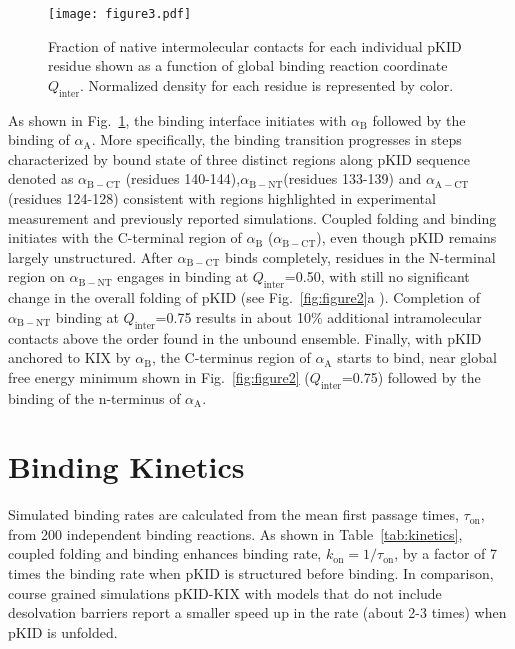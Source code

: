 \documentclass[../talant.diss.submit.tex]{subfiles}
\begin{document}
\begin{figure}[h!]
  \centering
  \texttt{[image: figure3.pdf]}
  \caption{Fraction of native intermolecular contacts for each individual
    pKID residue shown as a function of global binding reaction coordinate $Q_{\mathrm{\mathrm{inter}}}$.
    Normalized density for each residue is represented by color.}
  \label{fig:figure3}
\end{figure}

As shown in Fig.~\ref{fig:figure3}, the binding interface initiates with
$\alpha_{\mathrm{B}}$ followed by the binding of $\alpha_{\mathrm{A}}$.  More
specifically, the binding transition progresses in steps characterized by bound
state of three distinct regions along pKID sequence denoted as
$\alpha_{\mathrm{B-CT}}$ (residues 140-144),$\alpha_{\mathrm{B-NT}}$(residues
133-139) and $\alpha_{\mathrm{A-CT}}$(residues 124-128) consistent with regions
highlighted in experimental measurement\cite{sugase:07} and previously reported
simulations.\cite{ganguly:11} Coupled folding and binding initiates with the
C-terminal region of $\alpha_{\mathrm{B}}$ ($\alpha_{\mathrm{B-CT}}$), even
though pKID remains largely unstructured. After $\alpha_{\mathrm{B-CT}}$ binds
completely, residues in the N-terminal region on $\alpha_{\mathrm{B-NT}}$
engages in binding at $Q_{\mathrm{inter}}$=0.50, with still no significant
change in the overall folding of pKID (see Fig.~\ref{fig:figure2}a ).
Completion of $\alpha_{\mathrm{B-NT}}$ binding at $Q_{\mathrm{inter}}$=0.75
results in about 10\% additional intramolecular contacts above the order found
in the unbound ensemble.  Finally, with pKID anchored to KIX by
$\alpha_{\mathrm{B}}$, the C-terminus region of $\alpha_{\mathrm{A}}$ starts to
bind, near global free energy minimum shown in Fig.~\ref{fig:figure2}
($Q_{\mathrm{inter}}$=0.75) followed by the binding of the n-terminus of
$\alpha_{\mathrm{A}}$.

%
\section{\textbf{Binding Kinetics}}\label{sect:three_three}
%
Simulated binding rates are calculated from the mean first passage times,
$\tau_\mathrm{on}$, from 200 independent binding reactions. As shown in
Table~\ref{tab:kinetics}, coupled folding and binding enhances binding rate,
$k_\mathrm{on} = 1/\tau_{\mathrm{on}}$, by a factor of 7 times the binding rate
when pKID is structured before binding.  In comparison, course grained
simulations pKID-KIX with models that do not include desolvation barriers report
a smaller speed up in the rate (about 2-3 times) when pKID is
unfolded\cite{turjanski:08,huang:09}.
\end{document}
